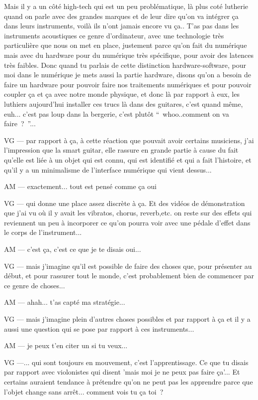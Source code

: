 Mais il y a un côté high-tech qui est un peu problématique, là plus coté lutherie quand on parle avec des grandes marques et de leur dire qu'on va intégrer ça dans leurs instruments, voilà ils n'ont jamais encore vu ça.. 
T'as pas dans les instruments acoustiques ce genre d'ordinateur, avec une technologie très particulière que nous on met en place, justement parce qu'on fait du numérique mais avec du hardware pour du numérique très spécifique, pour avoir des latences très faibles. 
Donc quand tu parlais de cette distinction hardware-software, pour moi dans le numérique je mets aussi la partie hardware, disons qu'on a besoin de faire un hardware pour pouvoir faire nos traitements numériques et pour pouvoir coupler ça et ça avec notre monde physique, et donc là par rapport à eux, les luthiers aujourd'hui installer ces trucs là dans des guitares, c'est quand même, euh... c'est pas loup dans la bergerie, c'est plutôt “ whoo..comment on va faire ? ”... 

VG — par rapport à ça, à cette réaction que pouvait avoir certains musiciens, j'ai l'impression que la smart guitar, elle rassure en grande partie à cause du fait qu'elle est liée à un objet qui est connu, qui est identifié et qui a fait l'histoire, et qu'il y a un minimalisme de l'interface numérique qui vient dessus... 

AM — exactement... tout est pensé comme ça oui

VG — qui donne une place assez discrète à ça. Et des vidéos de démonstration que j'ai vu où il y avait les vibratos, chorus, reverb,etc. on reste sur des effets qui reviennent un peu à incorporer ce qu'on pourra voir avec une pédale d'effet dans le corps de l'instrument... 

AM — c'est ça, c'est ce que je te disais oui... 

VG —  mais j'imagine qu'il est possible de faire des choses que, pour présenter au début, et pour rassurer tout le monde, c'est probablement bien de commencer par ce genre de choses... 

AM — ahah... t'as capté ma stratégie... 

VG — mais j'imagine plein d'autres choses possibles et par rapport à ça et il y a aussi une question qui se pose par rapport à ces instruments... 

AM — je peux t'en citer un si tu veux... 

VG —... qui sont toujours en mouvement, c'est l'apprentissage. Ce que tu disais par rapport avec violonistes qui disent 'mais moi je ne peux pas faire ça'... Et certains auraient tendance à prétendre qu'on ne peut pas les apprendre parce que l'objet change sans arrêt... comment vois tu ça toi ?

